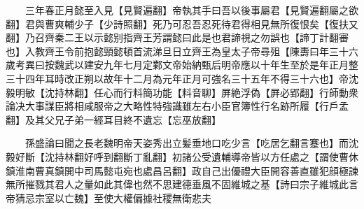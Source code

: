 　　三年春正月懿至入見【見賢遍翻】帝執其手曰吾以後事屬君【見賢遍翻屬之欲翻】君與曹爽輔少子【少詩照翻】死乃可忍吾忍死待君得相見無所復恨矣【復扶又翻】乃召齊秦二王以示懿别指齊王芳謂懿曰此是也君諦視之勿誤也【諦丁計翻審也】入教齊王令前抱懿頸懿頓首流涕旦日立齊王為皇太子帝尋殂【陳夀曰年三十六歲考異曰按魏武以建安九年七月定鄴文帝始納甄后明帝應以十年生至於是年正月整三十四年耳時改正朔以故年十二月為元年正月可強名三十五年不得三十六也】帝沈毅明敏【沈持林翻】任心而行料簡功能【料音聊】屏絶浮偽【屛必郢翻】行師動衆論决大事謀臣將相咸服帝之大略性特強識雖左右小臣官簿性行名跡所履【行戶孟翻】及其父兄子弟一經耳目終不遺忘【忘巫放翻】

　　孫盛論曰聞之長老魏明帝天姿秀出立髪垂地口吃少言【吃居乞翻言蹇也】而沈毅好斷【沈持林翻好呼到翻斷丁亂翻】初諸公受遺輔導帝皆以方任處之【謂使曹休鎮淮南曹真鎮閧中司馬懿屯宛也處昌呂翻】政自己出優禮大臣開容善直雖犯顔極諫無所摧戮其君人之量如此其偉也然不思建德垂風不固維城之基【詩曰宗子維城此言帝猜忌宗室以亡魏】至使大權偏據社稷無衛悲夫

